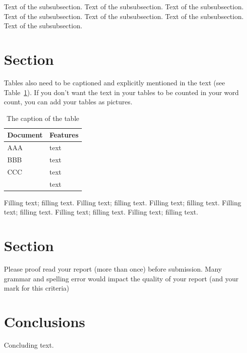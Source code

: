 \documentclass[11pt]{article}
\begin{document}
Text of the subsubsection.
Text of the subsubsection.
Text of the subsubsection.
Text of the subsubsection.
Text of the subsubsection.
Text of the subsubsection.
Text of the subsubsection.

\section{Section}
Tables also need to be captioned and explicitly mentioned in the text (see Table~\ref{table1}). If you don’t want the text in your tables to be counted in your word count, you can add your tables as pictures.

\begin{table}[h]
	\begin{center}
		\begin{tabular}{|l|l|}			
			\hline
			Document & Features\\
			\hline\hline
			AAA & text\\
			BBB & text\\
			CCC & text\\
			& text\\
			\hline
			
		\end{tabular}
		\caption{The caption of the table}
		\label{table1}
		
	\end{center}
\end{table}

Filling text; filling text.
Filling text; filling text.
Filling text; filling text.
Filling text; filling text.
Filling text; filling text.
Filling text; filling text.

\section{Section}

Please proof read your report (more than once) before submission. Many grammar and spelling error would impact the quality of your report (and your mark for this criteria)

\section{Conclusions}

Concluding text.



\end{document}
